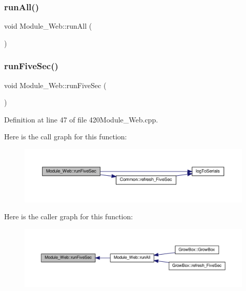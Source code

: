 \subsubsection{\texorpdfstring{run\+All()}{runAll()}\hspace{0.1cm}{\footnotesize\ttfamily [2/2]}}
{\footnotesize\ttfamily void Module\+\_\+\+Web\+::run\+All (\begin{DoxyParamCaption}{ }\end{DoxyParamCaption})}

\mbox{\label{class_module___web_a39cb72b8b1193e6a7d27d4ff414e07c6}} 
\subsubsection{\texorpdfstring{run\+Five\+Sec()}{runFiveSec()}\hspace{0.1cm}{\footnotesize\ttfamily [1/2]}}
{\footnotesize\ttfamily void Module\+\_\+\+Web\+::run\+Five\+Sec (\begin{DoxyParamCaption}{ }\end{DoxyParamCaption})}



Definition at line 47 of file 420\+Module\+\_\+\+Web.\+cpp.

Here is the call graph for this function\+:
\nopagebreak
\begin{figure}[H]
\begin{center}
\leavevmode
\includegraphics[width=350pt]{class_module___web_a39cb72b8b1193e6a7d27d4ff414e07c6_cgraph}
\end{center}
\end{figure}
Here is the caller graph for this function\+:
\nopagebreak
\begin{figure}[H]
\begin{center}
\leavevmode
\includegraphics[width=350pt]{class_module___web_a39cb72b8b1193e6a7d27d4ff414e07c6_icgraph}
\end{center}
\end{figure}
\mbox{\label{class_module___web_a39cb72b8b1193e6a7d27d4ff414e07c6}} 
